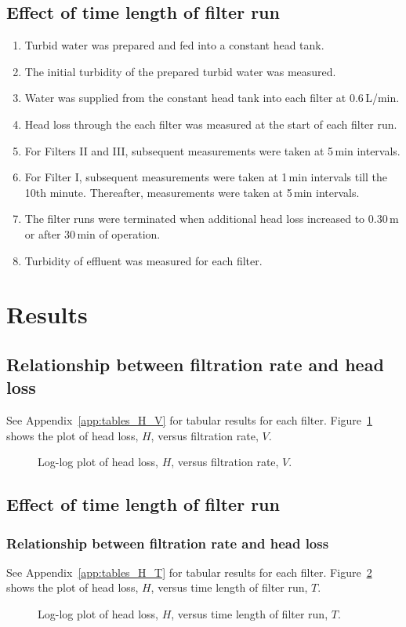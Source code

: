 \documentclass{article}
\begin{document}
\subsection{Effect of time length of filter run}
\begin{enumerate}
\item Turbid water was prepared and fed into a constant head tank.
\item The initial turbidity of the prepared turbid water was measured.
\item Water was supplied from the constant head tank into each filter at 
      0.6\,L/min.
\item Head loss through the each filter was measured at the start of each 
      filter run.
\item For Filters II and III, subsequent measurements were taken at 5\,min 
      intervals.
\item For Filter I, subsequent measurements were taken at 1\,min intervals 
      till the 10th minute. Thereafter, measurements were taken at 5\,min
      intervals.
\item The filter runs were terminated when additional head loss increased
      to 0.30\,m or after 30\,min of operation.
\item Turbidity of effluent was measured for each filter.
\end{enumerate}



\section{Results}
\subsection{Relationship between filtration rate and head loss}
See Appendix~\ref{app:tables_H_V} for tabular results for each filter. 
Figure~\ref{fig:H_V} shows the plot of head loss, $H$, versus filtration rate,
$V$.

\begin{figure}[htbp]
\centering

\caption{Log-log plot of head loss, $H$, versus filtration rate, $V$.}
\label{fig:H_V}
\end{figure}


\subsection{Effect of time length of filter run}
\subsubsection{Relationship between filtration rate and head loss}
See Appendix~\ref{app:tables_H_T} for tabular results for each filter. 
Figure~\ref{fig:H_T} shows the plot of head loss, $H$, versus 
time length of filter run, $T$.
\begin{figure}[htbp]
\centering

\caption{Log-log plot of head loss, $H$, versus time length of filter run, $T$.}
\label{fig:H_T}
\end{figure}
\end{document}
